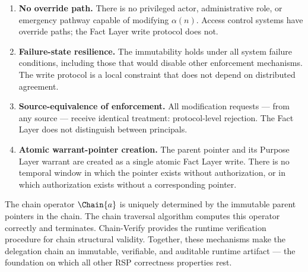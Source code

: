 \begin{enumerate}
    \item[(1)] \textbf{No override path.} There is no privileged actor, administrative role, or emergency pathway capable of modifying $\alpha(n)$. Access control systems have override paths; the Fact Layer write protocol does not.
    \item[(2)] \textbf{Failure-state resilience.} The immutability holds under all system failure conditions, including those that would disable other enforcement mechanisms. The write protocol is a local constraint that does not depend on distributed agreement.
    \item[(3)] \textbf{Source-equivalence of enforcement.} All modification requests — from any source — receive identical treatment: protocol-level rejection. The Fact Layer does not distinguish between principals.
    \item[(4)] \textbf{Atomic warrant-pointer creation.} The parent pointer and its Purpose Layer warrant are created as a single atomic Fact Layer write. There is no temporal window in which the pointer exists without authorization, or in which authorization exists without a corresponding pointer.
\end{enumerate}

The chain operator $\Chain{a}$ is uniquely determined by the immutable parent pointers in the chain. The chain traversal algorithm computes this operator correctly and terminates. Chain-Verify provides the runtime verification procedure for chain structural validity. Together, these mechanisms make the delegation chain an immutable, verifiable, and auditable runtime artifact — the foundation on which all other RSP correctness properties rest.
